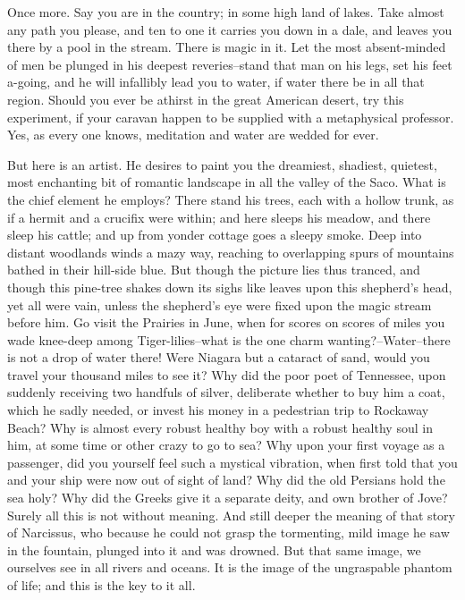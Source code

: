 Once more. Say you are in the country; in some high land of lakes.
Take almost any path you please, and ten to one it carries you down
in a dale, and leaves you there by a pool in the stream. There is
magic in it. Let the most absent-minded of men be plunged in his
deepest reveries--stand that man on his legs, set his feet a-going,
and he will infallibly lead you to water, if water there be in all
that region. Should you ever be athirst in the great American
desert, try this experiment, if your caravan happen to be supplied
with a metaphysical professor. Yes, as every one knows, meditation
and water are wedded for ever.

But here is an artist. He desires to paint you the dreamiest,
shadiest, quietest, most enchanting bit of romantic landscape in all
the valley of the Saco. What is the chief element he employs? There
stand his trees, each with a hollow trunk, as if a hermit and a
crucifix were within; and here sleeps his meadow, and there sleep his
cattle; and up from yonder cottage goes a sleepy smoke. Deep into
distant woodlands winds a mazy way, reaching to overlapping spurs of
mountains bathed in their hill-side blue. But though the picture
lies thus tranced, and though this pine-tree shakes down its sighs
like leaves upon this shepherd's head, yet all were vain, unless the
shepherd's eye were fixed upon the magic stream before him. Go visit
the Prairies in June, when for scores on scores of miles you wade
knee-deep among Tiger-lilies--what is the one charm
wanting?--Water--there is not a drop of water there! Were Niagara
but a cataract of sand, would you travel your thousand miles to see
it? Why did the poor poet of Tennessee, upon suddenly receiving two
handfuls of silver, deliberate whether to buy him a coat, which he
sadly needed, or invest his money in a pedestrian trip to Rockaway
Beach? Why is almost every robust healthy boy with a robust healthy
soul in him, at some time or other crazy to go to sea? Why upon your
first voyage as a passenger, did you yourself feel such a mystical
vibration, when first told that you and your ship were now out of
sight of land? Why did the old Persians hold the sea holy? Why did
the Greeks give it a separate deity, and own brother of Jove? Surely
all this is not without meaning. And still deeper the meaning of
that story of Narcissus, who because he could not grasp the
tormenting, mild image he saw in the fountain, plunged into it and
was drowned. But that same image, we ourselves see in all rivers and
oceans. It is the image of the ungraspable phantom of life; and this
is the key to it all.

